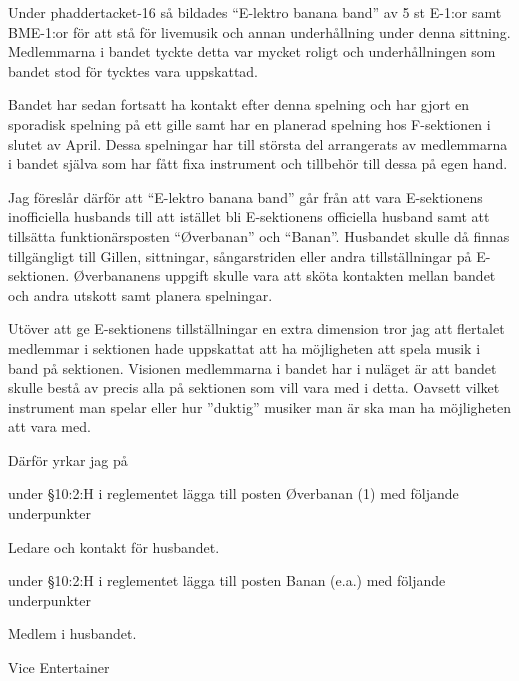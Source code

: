 \documentclass[../_main/handlingar.tex]{subfiles}
\begin{document}

Under phaddertacket-16 så bildades ``E-lektro banana band'' av 5 st E-1:or samt BME-1:or för att stå för livemusik och annan underhållning under denna sittning.
Medlemmarna i bandet tyckte detta var mycket roligt och underhållningen som bandet stod för tycktes vara uppskattad.

Bandet har sedan fortsatt ha kontakt efter denna spelning och har gjort en sporadisk spelning på ett gille samt har en planerad spelning hos F-sektionen i slutet av April. Dessa spelningar har till största del arrangerats av medlemmarna i bandet själva som har fått fixa instrument och tillbehör till dessa på egen hand.

Jag föreslår därför att ``E-lektro banana band'' går från att vara E-sektionens inofficiella husbands till att istället bli E-sektionens officiella husband samt att tillsätta funktionärsposten ``Øverbanan'' och ``Banan''. Husbandet skulle då finnas tillgängligt till Gillen, sittningar, sångarstriden eller andra tillställningar på E-sektionen. Øverbananens uppgift skulle vara att sköta kontakten mellan bandet och andra utskott samt planera spelningar.

Utöver att ge E-sektionens tillställningar en extra dimension tror jag att flertalet medlemmar i sektionen hade uppskattat att ha möjligheten att spela musik i band på sektionen. Visionen medlemmarna i bandet har i nuläget är att bandet skulle bestå av precis alla på sektionen som vill vara med i detta. Oavsett vilket instrument man spelar eller hur ”duktig” musiker man är ska man ha möjligheten att vara med.

Därför yrkar jag på
\begin{attsatser}
    \att under \S10:2:H i reglementet lägga till posten Øverbanan (1) med följande underpunkter
    \begin{itemizedash}
            \item Ledare och kontakt för husbandet.
     \end{itemizedash}
     \att under \S10:2:H i reglementet lägga till posten Banan (e.a.) med följande underpunkter
     \begin{itemizedash}
             \item Medlem i husbandet.
      \end{itemizedash}
\end{attsatser}

\begin{signatures}{1}
    \mvh
    \signature{Max Mauritsson}{Vice Entertainer}
\end{signatures}
\end{document}
